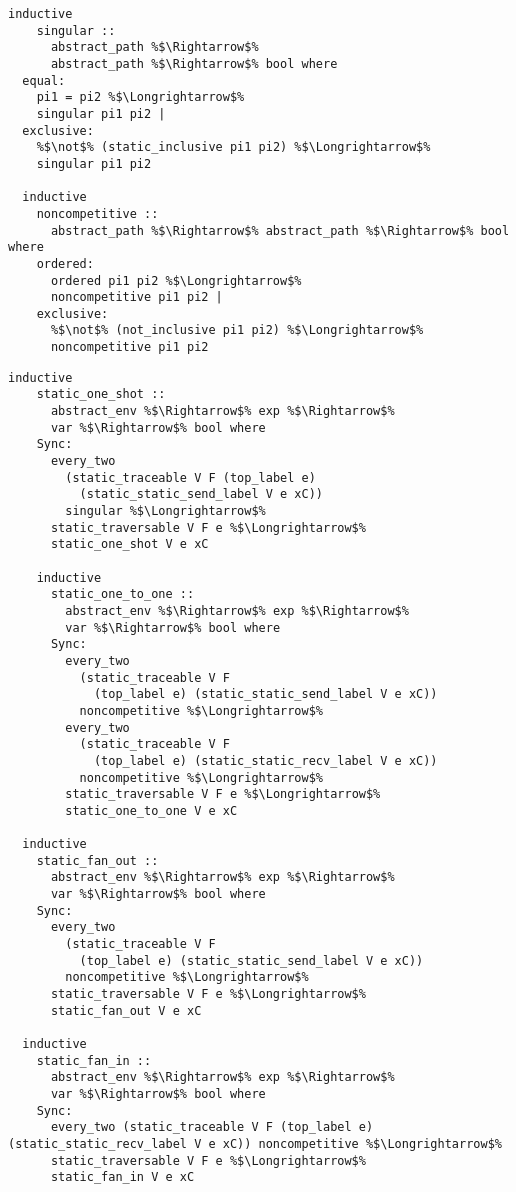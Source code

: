 \documentclass{article}
\begin{document}
\begin{lstlisting}[style=codestyle1, escapechar=\%]
  inductive
    singular ::
      abstract_path %$\Rightarrow$%
      abstract_path %$\Rightarrow$% bool where
  equal:
    pi1 = pi2 %$\Longrightarrow$% 
    singular pi1 pi2 |
  exclusive:
    %$\not$% (static_inclusive pi1 pi2) %$\Longrightarrow$% 
    singular pi1 pi2

  inductive
    noncompetitive ::
      abstract_path %$\Rightarrow$% abstract_path %$\Rightarrow$% bool where
    ordered:
      ordered pi1 pi2 %$\Longrightarrow$% 
      noncompetitive pi1 pi2 |
    exclusive:
      %$\not$% (not_inclusive pi1 pi2) %$\Longrightarrow$% 
      noncompetitive pi1 pi2
  \end{lstlisting}

\begin{lstlisting}[style=codestyle1, escapechar=\%]
  inductive
    static_one_shot ::
      abstract_env %$\Rightarrow$% exp %$\Rightarrow$%
      var %$\Rightarrow$% bool where
    Sync:
      every_two
        (static_traceable V F (top_label e)
          (static_static_send_label V e xC))
        singular %$\Longrightarrow$%
      static_traversable V F e %$\Longrightarrow$%
      static_one_shot V e xC 

    inductive
      static_one_to_one ::
        abstract_env %$\Rightarrow$% exp %$\Rightarrow$%
        var %$\Rightarrow$% bool where
      Sync:
        every_two
          (static_traceable V F
            (top_label e) (static_static_send_label V e xC))
          noncompetitive %$\Longrightarrow$%
        every_two
          (static_traceable V F
            (top_label e) (static_static_recv_label V e xC))
          noncompetitive %$\Longrightarrow$%
        static_traversable V F e %$\Longrightarrow$%
        static_one_to_one V e xC 

  inductive
    static_fan_out ::
      abstract_env %$\Rightarrow$% exp %$\Rightarrow$%
      var %$\Rightarrow$% bool where
    Sync:
      every_two
        (static_traceable V F
          (top_label e) (static_static_send_label V e xC))
        noncompetitive %$\Longrightarrow$%
      static_traversable V F e %$\Longrightarrow$%
      static_fan_out V e xC 

  inductive
    static_fan_in ::
      abstract_env %$\Rightarrow$% exp %$\Rightarrow$%
      var %$\Rightarrow$% bool where
    Sync:
      every_two (static_traceable V F (top_label e) (static_static_recv_label V e xC)) noncompetitive %$\Longrightarrow$%
      static_traversable V F e %$\Longrightarrow$%
      static_fan_in V e xC

    \end{lstlisting}
\end{document}
